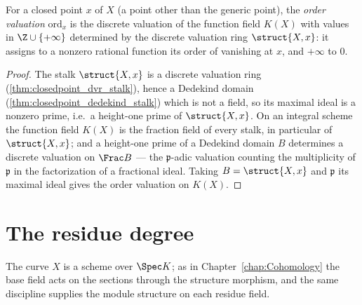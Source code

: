 \begin{definition}
  \label{def:scheme_ord}
  \leanok
  For a closed point \(x\) of \(X\) (a point other than the generic point), the
  \emph{order valuation} \(\mathrm{ord}_x\) is the discrete valuation of the function field
  \(K(X)\) with values in \(\Z \cup \{+\infty\}\) determined by the discrete valuation ring
  \(\struct{X,x}\): it assigns to a nonzero rational function its order of vanishing at \(x\),
  and \(+\infty\) to \(0\).
\end{definition}
\begin{proof}
  \leanok
  The stalk \(\struct{X,x}\) is a discrete valuation ring (\ref{thm:closedpoint_dvr_stalk}),
  hence a Dedekind domain (\ref{thm:closedpoint_dedekind_stalk}) which is not a field, so its
  maximal ideal is a nonzero prime, i.e.\ a height-one prime of \(\struct{X,x}\). On an integral
  scheme the function field \(K(X)\) is the fraction field of every stalk, in particular of
  \(\struct{X,x}\); and a height-one prime of a Dedekind domain \(B\) determines a discrete
  valuation on \(\Frac B\) --- the \(\mathfrak p\)-adic valuation counting the multiplicity of
  \(\mathfrak p\) in the factorization of a fractional ideal. Taking \(B = \struct{X,x}\) and
  \(\mathfrak p\) its maximal ideal gives the order valuation on \(K(X)\).
\end{proof}

\section{The residue degree}

The curve \(X\) is a scheme over \(\Spec K\); as in Chapter~\ref{chap:Cohomology} the base field
acts on the sections through the structure morphism, and the same discipline supplies the module
structure on each residue field.

